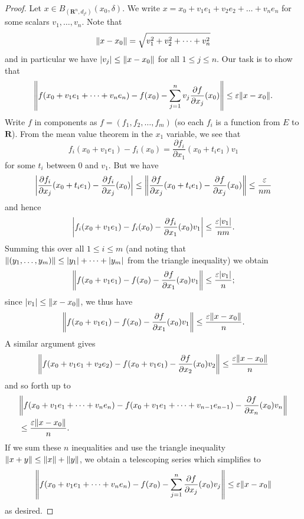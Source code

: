 \begin{proof}
    Let \(x \in B_{(\mathbf{R}^n, d_{l^2})}(x_0, \delta)\).
    We write \(x = x_0 + v_1 e_1 + v_2 e_2 + \dots + v_n e_n\) for some scalars \(v_1, \dots, v_n\).
    Note that
    \[
        \norm*{x - x_0} = \sqrt{v_1^2 + v_2^2 + \dots + v_n^2}
    \]
    and in particular we have \(\abs*{v_j} \leq \norm*{x - x_0}\) for all \(1 \leq j \leq n\).
    Our task is to show that
    \[
        \norm*{f(x_0 + v_1 e_1 + \dots + v_n e_n) - f(x_0) - \sum_{j = 1}^n v_j \frac{\partial f}{\partial x_j}(x_0)} \leq \varepsilon \norm*{x - x_0}.
    \]
    Write \(f\) in components as \(f = (f_1 , f_2, \dots, f_m)\)
    (so each \(f_i\) is a function from \(E\) to \(\mathbf{R}\)).
    From the mean value theorem in the \(x_1\) variable, we see that
    \[
        f_i(x_0 + v_1 e_1) - f_i(x_0) = \frac{\partial f_i}{\partial x_1}(x_0 + t_i e_1) v_1
    \]
    for some \(t_i\) between \(0\) and \(v_1\).
    But we have
    \[
        \abs*{\frac{\partial f_i}{\partial x_j}(x_0 + t_i e_1) - \frac{\partial f_i}{\partial x_j}(x_0)} \leq \norm*{\frac{\partial f}{\partial x_j}(x_0 + t_i e_1) - \frac{\partial f}{\partial x_j}(x_0)} \leq \frac{\varepsilon}{nm}
    \]
    and hence
    \[
        \abs*{f_i(x_0 + v_1 e_1) - f_i(x_0) - \frac{\partial f_i}{\partial x_1}(x_0) v_1} \leq \frac{\varepsilon \abs*{v_1}}{nm}.
    \]
    Summing this over all \(1 \leq i \leq m\) (and noting that \(\norm*{(y_1, \dots, y_m)} \leq \abs*{y_1} + \dots + \abs*{y_m}\) from the triangle inequality) we obtain
    \[
        \norm*{f(x_0 + v_1 e_1) - f(x_0) - \frac{\partial f}{\partial x_1}(x_0) v_1} \leq \frac{\varepsilon \abs*{v_1}}{n};
    \]
    since \(\abs*{v_1} \leq \norm*{x - x_0}\), we thus have
    \[
        \norm*{f(x_0 + v_1 e_1) - f(x_0) - \frac{\partial f}{\partial x_1}(x_0) v_1} \leq \frac{\varepsilon \norm*{x - x_0}}{n}.
    \]
    A similar argument gives
    \[
        \norm*{f(x_0 + v_1 e_1 + v_2 e_2) - f(x_0 + v_1 e_1) - \frac{\partial f}{\partial x_2}(x_0) v_2} \leq \frac{\varepsilon \norm*{x - x_0}}{n}
    \]
    and so forth up to
    \begin{align*}
         & \norm*{f(x_0 + v_1 e_1 + \dots + v_n e_n) - f(x_0 + v_1 e_1 + \dots + v_{n - 1} e_{n - 1}) - \frac{\partial f}{\partial x_n}(x_0) v_n} \\
         & \leq \frac{\varepsilon \norm*{x - x_0}}{n}.
    \end{align*}
    If we sum these \(n\) inequalities and use the triangle inequality \(\norm*{x + y} \leq \norm*{x} + \norm*{y}\), we obtain a telescoping series which simplifies to
    \[
        \norm*{f(x_0 + v_1 e_1 + \dots + v_n e_n) - f(x_0) - \sum_{j = 1}^n \frac{\partial f}{\partial x_j}(x_0) v_j} \leq \varepsilon \norm*{x - x_0}
    \]
    as desired.
\end{proof}

